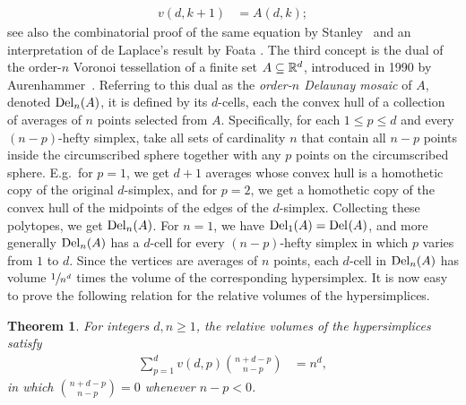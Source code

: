 \documentclass[10pt,a4paper]{article}
\newtheorem{theorem}{Theorem}[section]
\newcommand {\mm}[1] {\ifmmode{#1}\else{\mbox{\(#1\)}}\fi}
\theoremstyle{plain}
\newcommand{\Rspace}        {\mm{{\mathbb R}}}
\newcommand{\Delaunay}[2]   {\mm{{\rm Del}_{#1}{({#2})}}}
\begin{document}
\begin{align}
  v(d,k+1) &= A(d,k) ;
  \label{eqn:Laplace_relation}
\end{align}
see also the combinatorial proof of the same equation by Stanley~\cite{Sta77} and an interpretation of de Laplace's result by Foata \cite{Foa77}.
The third concept is the dual of the order-$n$ Voronoi tessellation of a finite set $A \subseteq \Rspace^d$, introduced in 1990 by Aurenhammer~\cite{Aur90}.
Referring to this dual as the \emph{order-$n$ Delaunay mosaic} of $A$, denoted $\Delaunay{n}{A}$, it is defined by its $d$-cells, each the convex hull of a collection of averages of $n$ points selected from $A$.
Specifically, for each $1 \leq p \leq d$ and every $(n-p)$-hefty simplex, take all sets of cardinality $n$ that contain all $n-p$ points inside the circumscribed sphere together with any $p$ points on the circumscribed sphere.
E.g.\ for $p=1$, we get $d+1$ averages whose convex hull is a homothetic copy of the original $d$-simplex, and for $p=2$, we get a homothetic copy of the convex hull of the midpoints of the edges of the $d$-simplex.
Collecting these polytopes, we get $\Delaunay{n}{A}$.
For $n=1$, we have $\Delaunay{1}{A} = \Delaunay{}{A}$, and more generally $\Delaunay{n}{A}$ has a $d$-cell for every $(n-p)$-hefty simplex in which $p$ varies from $1$ to $d$.
Since the vertices are averages of $n$ points, each $d$-cell in $\Delaunay{n}{A}$ has volume $\sfrac{1}{n^d}$ times the volume of the corresponding hypersimplex.
It is now easy to prove the following relation for the relative volumes of the hypersimplices.
\begin{theorem}
  \label{thm:hypersimplex_identity}
  For integers $d, n \geq 1$,
  the relative volumes of the hypersimplices satisfy
  \begin{align}
    \sum\nolimits_{p=1}^{d} v(d,p) \binom{n+d-p}{n-p} &= n^d ,
    \label{eqn:hypersimplex_identity}
  \end{align}
  in which $\binom{n+d-p}{n-p} = 0$ whenever $n-p < 0$.
\end{theorem}
\end{document}
